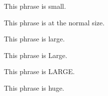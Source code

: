 \documentclass[12pt]{article}
\begin{document}
{\small This phrase is small.}

This phrase is at the normal size.

{\large This phrase is large.}

{\Large This phrase is Large.}

{\LARGE This phrase is LARGE.}

{\huge This phrase is huge.}
\end{document}
